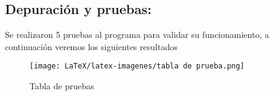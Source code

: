     
\subsection{\textbf{Depuración y pruebas:}}
Se realizaron 5 pruebas al programa para validar su funcionamiento, a continuación veremos los siguientes resultados 



   \begin{figure}[H]
    \centering
    \texttt{[image: LaTeX/latex-imagenes/tabla de prueba.png]}
    \caption{Tabla de pruebas}
    \label{fig:Grafica de la distancia de dos puntos }
\end{figure}